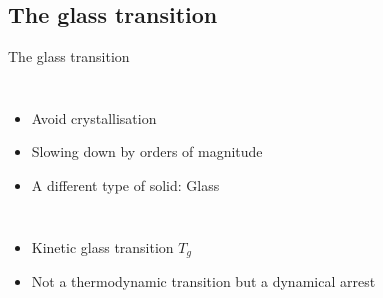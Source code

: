 \subsection{The glass transition}

\begin{frame}{The glass transition}
	\begin{columns}
	\resizebox{1.1\columnwidth}{!}{}%
	\begin{itemize}
		\item Avoid crystallisation
		\item Slowing down by orders of magnitude
		\item A different type of solid: Glass
	\end{itemize}
	\end{columns}
	\begin{itemize}
		\item Kinetic glass transition $T_g$
		\item Not a thermodynamic transition but a dynamical arrest
	\end{itemize}
\end{frame}

